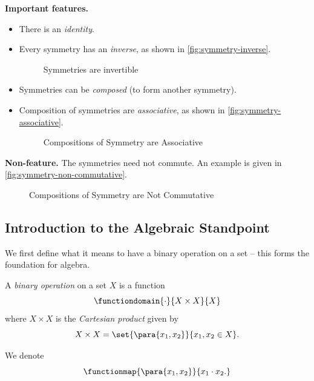 \noindent
\textbf{Important features.}
\begin{itemize}
    \item There is an \emph{identity}.
    \item Every symmetry has an \emph{inverse}, as shown in \autoref{fig:symmetry-inverse}.

    \begin{figure}[ht!]
        \centering
        \caption{Symmetries are invertible}
        \label{fig:symmetry-inverse}
    \end{figure}

    \item Symmetries can be \emph{composed} (to form another symmetry).
    \item Composition of symmetries are \emph{associative}, as shown in \autoref{fig:symmetry-associative}.

    \begin{figure}[ht!]
        \centering
        \caption{Compositions of Symmetry are Associative}
        \label{fig:symmetry-associative}
    \end{figure}
\end{itemize}

\noindent
\textbf{Non-feature.} The symmetries need not commute. An example is given in \autoref{fig:symmetry-non-commutative}.

\begin{figure}[ht!]
    \centering
    \caption{Compositions of Symmetry are Not Commutative}
    \label{fig:symmetry-non-commutative}
\end{figure}

\subsection{Introduction to the Algebraic Standpoint}
\label{sec:algebraic-standpoint}

We first define what it means to have a binary operation on a set -- this forms the foundation for algebra.

\begin{definition}
    \label{def:binary-operation}%
    A \emph{binary operation} on a set \(X\) is a function
    \[
        \functiondomain{\cdot}{X \times X}{X}
    \]
    where \(X \times X\) is the \emph{Cartesian product} given by
    \[
        X \times X = \set{\para{x_1, x_2}}{x_1, x_2 \in X}.
    \]
    
    We denote
    \[
        \functionmap{\para{x_1, x_2}}{x_1 \cdot x_2.}
    \]
\end{definition}

